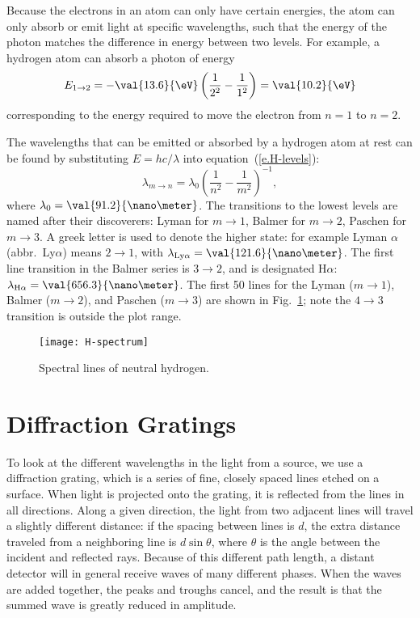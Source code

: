 Because the electrons in an atom can only have certain energies, the atom can only absorb or emit light at specific wavelengths, such that the energy of the photon matches the difference in energy between two levels.  For example, a hydrogen atom can absorb a photon of energy
\[
	E_{1\to2} = -\val{13.6}{\eV} \left(\frac{1}{2^{2}} - \frac{1}{1^{2}}\right)
		 = \val{10.2}{\eV}
\]
corresponding to the energy required to move the electron from  $n=1$ to $n=2$.

The wavelengths that can be emitted or absorbed by a hydrogen atom at rest can be found by substituting $E = hc/\lambda$ into equation~(\ref{e.H-levels}):
\begin{equation}
	\lambda_{m\to n} = \lambda_{0}\left(\frac{1}{n^{2}}-\frac{1}{m^{2}}\right)^{-1},
\end{equation}
where $\lambda_{0} = \val{91.2}{\nano\meter}$.
The transitions to the lowest levels are named after their discoverers: Lyman for $m\to1$, Balmer for $m\to2$, Paschen for $m\to3$. A greek letter is used to denote the higher state: for example Lyman $\alpha$ (abbr.\ Ly$\alpha$) means $2\to1$, with $\lambda_{\mathrm{Ly}\alpha} = \val{121.6}{\nano\meter}$.  The first line transition in the Balmer series is $3\to2$, and is designated H$\alpha$: $\lambda_{\mathrm{H}\alpha} = \val{656.3}{\nano\meter}$. The first 50 lines for the Lyman ($m\to1$), Balmer ($m\to2$), and Paschen ($m\to3$) are shown in Fig.~\ref{f.H-spectrum}; note the $4\to3$ transition is outside the plot range.

\begin{figure}[htbp]
\texttt{[image: H-spectrum]}
\caption{Spectral lines of neutral hydrogen. 
\label{f.H-spectrum}}
\end{figure}

\section{Diffraction Gratings}

To look at the different wavelengths in the light from a source, we use a diffraction grating, which is a series of fine, closely spaced lines etched on a surface.  When light is projected onto the grating, it is reflected from the lines in all directions.  Along a given direction, the light from two adjacent lines will travel a slightly different distance: if the spacing between lines is $d$, the extra distance traveled from a neighboring line is $d\sin\theta$, where $\theta$ is the angle between the incident and reflected rays. Because of this different path length, a distant detector will in general receive waves of many different phases. When the waves are added together, the peaks and troughs cancel, and the result is that the summed wave is greatly reduced in amplitude.

